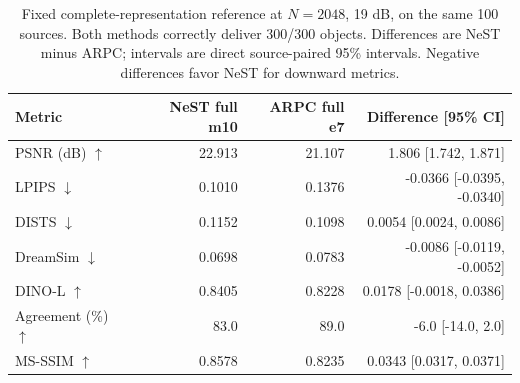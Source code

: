 \begin{table}[t]
\centering
\caption{Fixed complete-representation reference at $N=2048$, 19 dB, on the same 100 sources. Both methods correctly deliver 300/300 objects. Differences are NeST minus ARPC; intervals are direct source-paired 95\% intervals. Negative differences favor NeST for downward metrics.}
\label{tab:fixed2048}
\small\setlength{\tabcolsep}{9pt}
\begin{tabular}{lrrr}
\toprule
Metric & NeST full m10 & ARPC full e7 & Difference [95\% CI] \\
\midrule
PSNR (dB) $\uparrow$ & 22.913 & 21.107 & 1.806 [1.742, 1.871] \\
LPIPS $\downarrow$ & 0.1010 & 0.1376 & -0.0366 [-0.0395, -0.0340] \\
DISTS $\downarrow$ & 0.1152 & 0.1098 & 0.0054 [0.0024, 0.0086] \\
DreamSim $\downarrow$ & 0.0698 & 0.0783 & -0.0086 [-0.0119, -0.0052] \\
DINO-L $\uparrow$ & 0.8405 & 0.8228 & 0.0178 [-0.0018, 0.0386] \\
Agreement (\%) $\uparrow$ & 83.0 & 89.0 & -6.0 [-14.0, 2.0] \\
MS-SSIM $\uparrow$ & 0.8578 & 0.8235 & 0.0343 [0.0317, 0.0371] \\
\bottomrule
\end{tabular}
\end{table}
